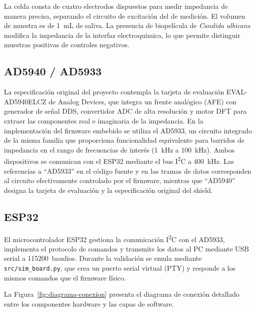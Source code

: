 \documentclass[11pt,a4paper,spanish]{book}
\begin{document}
La celda consta de cuatro electrodos dispuestos para medir impedancia de manera precisa, separando el circuito de excitaci\'{o}n del de medici\'{o}n. El volumen de muestra es de 1~mL de saliva. La presencia de biopel\'{i}cula de \textit{Candida albicans} modifica la impedancia de la interfaz electroqu\'{i}mica, lo que permite distinguir muestras positivas de controles negativos.

\subsection{AD5940 / AD5933}

La especificaci\'{o}n original del proyecto contempla la tarjeta de evaluaci\'{o}n EVAL-AD5940ELCZ de Analog Devices, que integra un frente anal\'{o}gico (AFE) con generador de se\~{n}al DDS, convertidor ADC de alta resoluci\'{o}n y motor DFT para extraer las componentes real e imaginaria de la impedancia. En la implementaci\'{o}n del firmware embebido se utiliza el AD5933, un circuito integrado de la misma familia que proporciona funcionalidad equivalente para barridos de impedancia en el rango de frecuencias de inter\'{e}s (1~kHz a 100~kHz). Ambos dispositivos se comunican con el ESP32 mediante el bus I\textsuperscript{2}C a 400~kHz. Las referencias a ``AD5933'' en el c\'{o}digo fuente y en las tramas de datos corresponden al circuito efectivamente controlado por el firmware, mientras que ``AD5940'' designa la tarjeta de evaluaci\'{o}n y la especificaci\'{o}n original del shield.

\subsection{ESP32}

El microcontrolador ESP32 gestiona la comunicaci\'{o}n I\textsuperscript{2}C con el AD5933, implementa el protocolo de comandos y transmite los datos al PC mediante USB serial a 115200~baudios. Durante la validaci\'{o}n se emula mediante \texttt{src/sim\_board.py}, que crea un puerto serial virtual (PTY) y responde a los mismos comandos que el firmware f\'{i}sico.

La Figura~\ref{fig:diagrama-conexion} presenta el diagrama de conexi\'{o}n detallado entre los componentes hardware y las capas de software.
\end{document}
